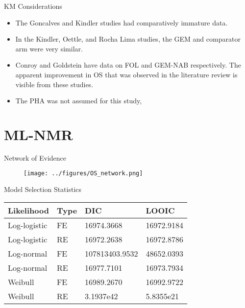 \documentclass{beamer}
\begin{document}
\begin{frame}{KM Considerations}
    \begin{itemize}
        \item The Goncalves and Kindler studies had comparatively immature data. 
        \pause
        \item In the Kindler, Oettle, and Rocha Lima studies, the GEM and comparator arm were very similar. 
        \pause
        \item Conroy and Goldstein have data on FOL and GEM-NAB respectively. The apparent improvement in OS that was observed in the literature review is visible from these studies. 
        \pause
        \item The PHA was not assumed for this study, 
    \end{itemize}
\end{frame}

\section{ML-NMR}
\begin{frame}{Network of Evidence}
    \begin{figure}
        \texttt{[image: ../figures/OS\_network.png]}
    \end{figure}    
\end{frame}

\begin{frame}{Model Selection Statistics}
\begin{table}
    \centering
    \begin{tabular}{llll}
    \hline
    Likelihood   & Type & DIC         & LOOIC      \\ \hline
    Log-logistic & FE  & 16974.3668  & 16972.9184 \\
    Log-logistic & RE & 16972.2638  & 16972.8786 \\
    Log-normal   & FE  & 107813403.9532  & 48652.0393 \\
    Log-normal   & RE & 16977.7101  & 16973.7934 \\
    Weibull      & FE  & 16989.2670 & 16992.9722 \\
    Weibull      & RE & 3.1937e42 & 5.8355e21 \\ \hline
    \end{tabular}
\end{table}
\end{frame}
\end{document}
